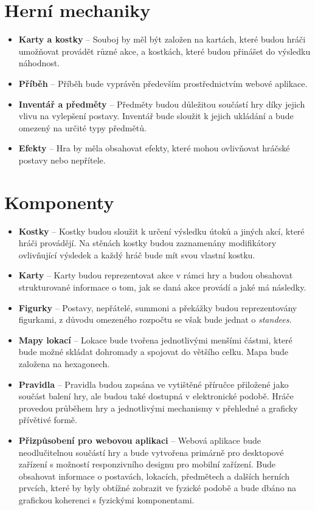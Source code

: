 \section{Herní mechaniky}
\label{sec:req_mechanics}

\begin{itemize}
    \item \textbf{Karty a kostky} -- 
        Souboj by měl být založen na kartách, které budou hráči umožňovat provádět různé akce, a kostkách, které budou přinášet do výsledku náhodnost.
    \item \textbf{Příběh} -- 
        Příběh bude vyprávěn především prostřednictvím webové aplikace.
    \item \textbf{Inventář a předměty} -- 
        Předměty budou důležitou součástí hry díky jejich vlivu na vylepšení postavy. Inventář bude sloužit k jejich ukládání a bude omezený na určité typy předmětů.
    \item \textbf{Efekty} -- 
        Hra by měla obsahovat efekty, které mohou ovlivňovat hráčské postavy nebo nepřítele.
\end{itemize}

\section{Komponenty}
\label{sec:req_components}

\begin{itemize}
    \item \textbf{Kostky} -- 
        Kostky budou sloužit k určení výsledku útoků a jiných akcí, které hráči provádějí. Na stěnách kostky budou zaznamenány modifikátory ovlivňující výsledek a každý hráč bude mít svou vlastní kostku.
    \item \textbf{Karty} --
        Karty budou reprezentovat akce v rámci hry a budou obsahovat strukturované informace o tom, jak se daná akce provádí a jaké má následky.
    \item \textbf{Figurky} --
        Postavy, nepřátelé, summoni a překážky budou reprezentovány figurkami, z důvodu omezeného rozpočtu se však bude jednat o \textit{standees}.
    \item \textbf{Mapy lokací} --
        Lokace bude tvořena jednotlivými menšími částmi, které bude možné skládat dohromady a spojovat do většího celku. Mapa bude založena na hexagonech.
    \item \textbf{Pravidla} --
        Pravidla budou zapsána ve vytištěné příručce přiložené jako součást balení hry, ale budou také dostupná v elektronické podobě. Hráče provedou průběhem hry a jednotlivými mechanismy v přehledné a graficky přívětivé formě.
    \item \textbf{Přizpůsobení pro webovou aplikaci} --
        Webová aplikace bude neodlučitelnou součástí hry a bude vytvořena primárně pro desktopové zařízení s možností responzivního designu pro mobilní zařízení. Bude obsahovat informace o postavách, lokacích, předmětech a dalších herních prvcích, které by byly obtížné zobrazit ve fyzické podobě a bude dbáno na grafickou koherenci s fyzickými komponentami.
\end{itemize}

